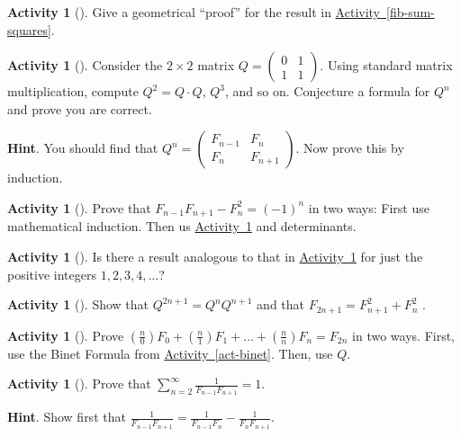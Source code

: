 \documentclass[10pt,]{book}
\theoremstyle{plain}
\theoremstyle{definition}
\theoremstyle{definition}
\theoremstyle{definition}
\newtheorem{activity}[project]{Activity}
\theoremstyle{definition}
\numberwithin{equation}{chapter}
\newcommand{\amp}{&}
\begin{document}
\begin{activity}[]\label{activity-98}
\hypertarget{p-873}{}%
Give a geometrical ``proof'' for the result in \hyperref[fib-sum-squares]{Activity~\ref{fib-sum-squares}}.%
\end{activity}
\begin{activity}[]\label{fib-matrix}
\hypertarget{p-874}{}%
Consider the \(2\times 2\) matrix \(Q = 
\begin{pmatrix}
0 \amp 1\\
1 \amp 1
\end{pmatrix}.\) Using standard matrix multiplication, compute \(Q^2 = Q\cdot Q\), \(Q^3\), and so on.  Conjecture a formula for \(Q^n\) and prove you are correct.%
\par\smallskip%
\noindent\textbf{Hint}.\hypertarget{hint-87}{}\quad%
\hypertarget{p-875}{}%
You should find that \(Q^n = \begin{pmatrix}
F_{n - 1} \amp F_{n}\\
F_{n} \amp F_{n + 1}
\end{pmatrix}\).  Now prove this by induction.%
\end{activity}
\begin{activity}[]\label{fib-neg-one}
\hypertarget{p-876}{}%
Prove that \(F_{n - 1}F_{n + 1} - F_{n}^{2} = (-1)^{n}\) in two ways:  First use mathematical induction.  Then us \hyperref[fib-matrix]{Activity~\ref{fib-matrix}} and determinants.%
\end{activity}
\begin{activity}[]\label{activity-101}
\hypertarget{p-877}{}%
Is there a result analogous to that in \hyperref[fib-neg-one]{Activity~\ref{fib-neg-one}} for just the positive integers \(1, 2, 3, 4, \ldots\)?%
\end{activity}
\begin{activity}[]\label{activity-102}
\hypertarget{p-878}{}%
Show that \(Q^{2n + 1} = Q^{n}Q^{n+1}\) and that \(F_{2n + 1} = F_{n + 1}^{2} + F_{n}^{2}\) .%
\end{activity}
\begin{activity}[]\label{activity-103}
\hypertarget{p-879}{}%
Prove \(\left( \frac{n}{0} \right)F_{0} + \left( \frac{n}{1} \right)F_{1} + \ldots + \left( \frac{n}{n} \right)F_{n} = F_{2n}\) in two ways.  First, use the Binet Formula from \hyperref[act-binet]{Activity~\ref{act-binet}}.  Then, use \(Q\).%
\end{activity}
\begin{activity}[]\label{activity-104}
\hypertarget{p-880}{}%
Prove that \(\sum_{n = 2}^{\infty}\frac{1}{F_{n - 1}F_{n + 1}} = 1\).%
\par\smallskip%
\noindent\textbf{Hint}.\hypertarget{hint-88}{}\quad%
\hypertarget{p-881}{}%
Show first that \(\frac{1}{F_{n - 1}F_{n + 1}} = \frac{1}{F_{n - 1}F_{n}} -
\frac{1}{F_{n}F_{n + 1}}\).%
\end{activity}
\end{document}
